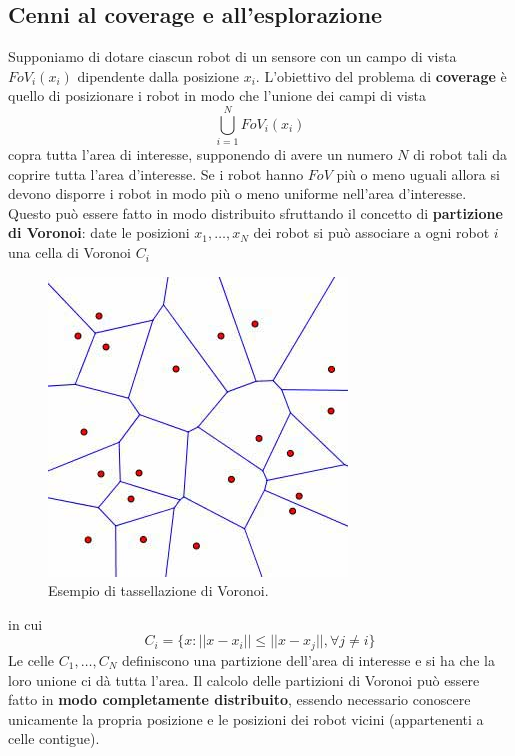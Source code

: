 \subsection{Cenni al coverage e all'esplorazione}
Supponiamo di dotare ciascun robot di un sensore con un campo di vista $FoV_i(x_i)$ dipendente dalla posizione $x_i$. L'obiettivo del problema di \textbf{coverage} \`e quello di posizionare i robot in modo che l'unione dei campi di vista
\begin{equation}
\bigcup_{i=1}^N FoV_i(x_i)
\end{equation} copra tutta l'area di interesse, supponendo di avere un numero $N$ di robot tali da coprire tutta l'area d'interesse. Se i robot hanno $FoV$ pi\`u o meno uguali allora si devono disporre i robot in modo pi\`u o meno uniforme nell'area d'interesse. Questo pu\`o essere fatto in modo distribuito sfruttando il concetto di \textbf{partizione di Voronoi}: date le posizioni $x_1, \dots, x_N$ dei robot si pu\`o associare a ogni robot $i$ una cella di Voronoi $C_i$

\begin{figure}
    \centering
    \includegraphics[scale=0.5]{img/voronoi.jpg}
    \caption{Esempio di tassellazione di Voronoi.}
    \label{fig:voronoi}
\end{figure}

in cui \begin{equation}
C_i = \{ x: ||x - x_i|| \leq ||x - x_j||, \forall j \neq i \}
\end{equation}
Le celle $C_1, \dots, C_N$ definiscono una partizione dell'area di interesse e si ha che la loro unione ci d\`a tutta l'area. Il calcolo delle partizioni di Voronoi pu\`o essere fatto in \textbf{modo completamente distribuito}, essendo necessario conoscere unicamente la propria posizione e le posizioni dei robot vicini (appartenenti a celle contigue).

